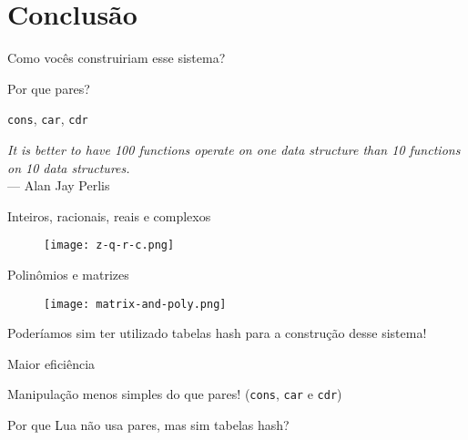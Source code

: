 
\section{Conclusão}
\begin{frame}[fragile]
\begin{center}

  {\Large Como vocês construiriam esse sistema?}

  \vspace{2em}
  \pause

  {\Large Por que pares?}

  \vspace{2em}
  \pause

  \texttt{cons}, \texttt{car}, \texttt{cdr}

  \vspace{2em}
  \pause

  \textit{It is better to have 100 functions operate on one data structure than 10 functions on 10 data structures.} \\
  --- Alan Jay Perlis
\end{center}
\end{frame}

\begin{frame}
  Inteiros, racionais, reais e complexos
  \pause
  \begin{figure}
    \centering
    \texttt{[image: z-q-r-c.png]}
  \end{figure}
  \pause
  Polinômios e matrizes
  \pause
  \begin{figure}
    \centering
    \texttt{[image: matrix-and-poly.png]}
  \end{figure}
\end{frame}



\begin{frame}
\end{frame}

\begin{frame}
  \begin{center}

  Poderíamos sim ter utilizado tabelas hash para a construção desse sistema!

  \pause
  \vspace{2em}

  Maior eficiência

  \pause
  \vspace{2em}

  Manipulação menos simples do que pares! (\texttt{cons}, \texttt{car} e \texttt{cdr})

  \pause
  \vspace{2em}

  Por que Lua não usa pares, mas sim tabelas hash?
  \end{center}
\end{frame}